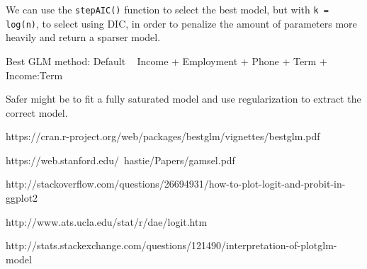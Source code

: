 We can use the \lstinline{stepAIC()} function to select the best model, but with \lstinline{k = log(n)}, to select using DIC, in order to penalize the amount of parameters more heavily and return a sparser model.

Best GLM method:
Default ~ Income + Employment + Phone + Term + Income:Term

Safer might be to fit a fully saturated model and use regularization to extract the correct model. 


https://cran.r-project.org/web/packages/bestglm/vignettes/bestglm.pdf

https://web.stanford.edu/~hastie/Papers/gamsel.pdf

http://stackoverflow.com/questions/26694931/how-to-plot-logit-and-probit-in-ggplot2

http://www.ats.ucla.edu/stat/r/dae/logit.htm

http://stats.stackexchange.com/questions/121490/interpretation-of-plotglm-model
